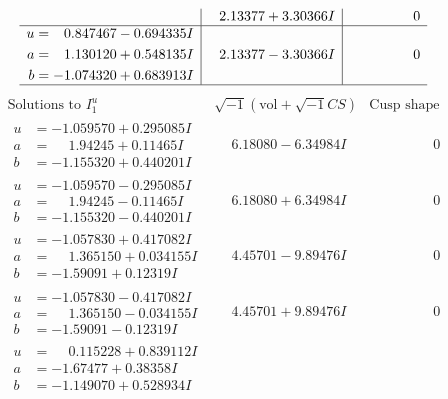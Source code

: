 \documentclass[1p]{elsarticle_modified}
\theoremstyle{definition}
\newcommand{\I}{\sqrt{-1}}
\begin{document}
$$\begin{array}{c|c|c}
 & \phantom{-}2.13377 + 3.30366 I & \phantom{-0.000000 } 0 \\ \hline\begin{aligned}
u &= \phantom{-}0.847467 - 0.694335 I \\
a &= \phantom{-}1.130120 + 0.548135 I \\
b &= -1.074320 + 0.683913 I\end{aligned}
 & \phantom{-}2.13377 - 3.30366 I & \phantom{-0.000000 } 0\\
 \hline 
 \end{array}$$\newpage$$\begin{array}{c|c|c}  
\text{Solutions to }I^u_{1}& \I (\text{vol} + \sqrt{-1}CS) & \text{Cusp shape}\\
 \hline 
\begin{aligned}
u &= -1.059570 + 0.295085 I \\
a &= \phantom{-}1.94245 + 0.11465 I \\
b &= -1.155320 + 0.440201 I\end{aligned}
 & \phantom{-}6.18080 - 6.34984 I & \phantom{-0.000000 } 0 \\ \hline\begin{aligned}
u &= -1.059570 - 0.295085 I \\
a &= \phantom{-}1.94245 - 0.11465 I \\
b &= -1.155320 - 0.440201 I\end{aligned}
 & \phantom{-}6.18080 + 6.34984 I & \phantom{-0.000000 } 0 \\ \hline\begin{aligned}
u &= -1.057830 + 0.417082 I \\
a &= \phantom{-}1.365150 + 0.034155 I \\
b &= -1.59091 + 0.12319 I\end{aligned}
 & \phantom{-}4.45701 - 9.89476 I & \phantom{-0.000000 } 0 \\ \hline\begin{aligned}
u &= -1.057830 - 0.417082 I \\
a &= \phantom{-}1.365150 - 0.034155 I \\
b &= -1.59091 - 0.12319 I\end{aligned}
 & \phantom{-}4.45701 + 9.89476 I & \phantom{-0.000000 } 0 \\ \hline\begin{aligned}
u &= \phantom{-}0.115228 + 0.839112 I \\
a &= -1.67477 + 0.38358 I \\
b &= -1.149070 + 0.528934 I\end{aligned}

\end{array}$$
\end{document}
